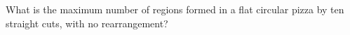 What is the maximum number of regions formed in a flat circular pizza by ten straight cuts, with no rearrangement?
